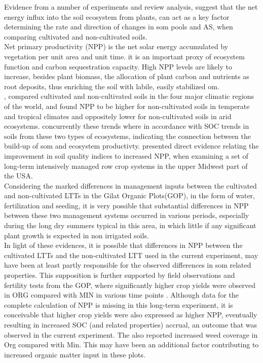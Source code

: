 	Evidence from a number of experiments and review analysis, suggest that the net energy influx into the soil ecosystem from plants, can act as a key factor determining the rate and direction of changes in \gls{som} pools  and AS, when comparing cultivated and non-cultivated soils. \\
	Net primary productivity (NPP) is the net solar energy accumulated by vegetation per unit area and unit time. it is an important proxy of ecosystem function and carbon sequestration capacity\citep{jackson2016}. High NPP levels are likely to increase, besides plant biomass, the allocation of plant carbon and nutrients as root deposits, thus enriching the soil with labile, easily stabilized \gls{om}.  \\
	\citeauthor{trivedi2016}, compared cultivated and non-cultivated soils in the four major climatic regions of the world, and found NPP to be higher for non-cultivated soils in temperate and tropical climates and oppositely lower for non-cultivated soils in arid ecosystems. concurrently these trends where in accordance with SOC trends in soils from these two types of ecosystems, indicating the connection between the build-up of \gls{som}  and ecosystem productivty. \citet{bhardwaj2011} presented direct evidence relating the improvement in soil quality indices to increased NPP, when examining a set of long-term intensively managed row crop systems in the upper Midwest part of the USA.\\
	Considering the marked differences in management inputs between the cultivated and non-cultivated LTTs in the Gilat Organic Plots(GOP), in the form of water, fertilization and seeding, it is very possible that substantial differences in NPP between these two management systems occurred in various periods, especially during the long dry summers typical in this area, in which little  if any significant plant growth is expected in non irrigated soils. \\
	In light of these evidences, it is possible that differences in NPP between the cultivated LTTs and the non-cultivated LTT used in the current experiment, may have been at least partly responsible for the observed differences in \gls{som} related properties.
	This supposition is further supported by field observations and fertility tests from the GOP, where significantly higher crop yields were observed in ORG compared with MIN in various time points . Although data for the complete calculation of NPP is missing in this long-term experiment, it is conceivable that higher crop yields were also expressed as higher NPP, eventually resulting in increased SOC (and related properties) accrual, an outcome that was observed in the current experiment. The  also reported increased weed coverage in Org compared with Min. This may have been an additional factor contributing to increased organic matter input in these plots.\\
